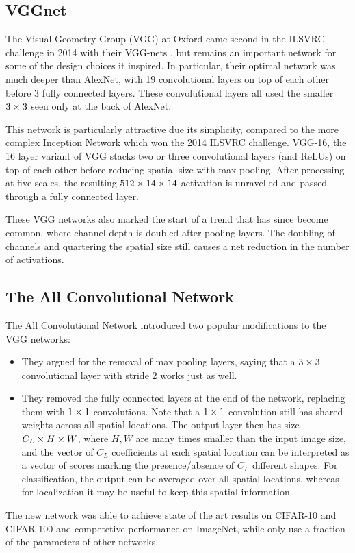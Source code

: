 \subsection{VGGnet}
The Visual Geometry Group (VGG) at Oxford came second in the ILSVRC challenge in
2014 with their VGG-nets \cite{simonyan_very_2014}, but remains an important
network for some of the design choices it inspired. In particular, their optimal
network was much deeper than AlexNet, with 19 convolutional layers on top of
each other before 3 fully connected layers. These convolutional layers all used
the smaller $3\times 3$ seen only at the back of AlexNet.

This network is particularly attractive due its simplicity, compared to the 
more complex Inception Network \cite{szegedy_going_2015} which won the 2014
ILSVRC challenge. VGG-16, the 16 layer variant of VGG stacks two or three
convolutional layers (and ReLUs) on top of each other before reducing spatial
size with max pooling. After processing at five scales, the resulting $512 \times 14
\times 14$ activation is unravelled and passed through a fully connected layer.

These VGG networks also marked the start of a trend that has since become
common, where channel depth is doubled after pooling layers. The doubling of
channels and quartering the spatial size still causes a net reduction in the
number of activations.

\subsection{The All Convolutional Network}
The All Convolutional Network \cite{springenberg_striving_2014-3} introduced two
popular modifications to the VGG networks:
%
\begin{itemize}
  \item They argued for the removal of max pooling layers, saying that a $3\times 3$
    convolutional layer with stride 2 works just as well.
  \item They removed the fully connected layers at the end of the network,
    replacing them with $1\times 1$ convolutions. Note that a $1\times 1$ convolution
    still has shared weights across all spatial locations. The output layer then
    has size $C_L \times H \times W$, where $H, W$ are many times smaller than the input
    image size, and the vector of $C_L$ coefficients at each spatial location
    can be interpreted as a vector of scores marking the presence/absence of
    $C_L$ different shapes. For classification, the output can be averaged over
    all spatial locations, whereas for localization it may be useful to keep
    this spatial information.
\end{itemize}
The new network was able to achieve state of the art results on CIFAR-10 and
CIFAR-100 and competetive performance on ImageNet, while only use a fraction of
the parameters of other networks.

